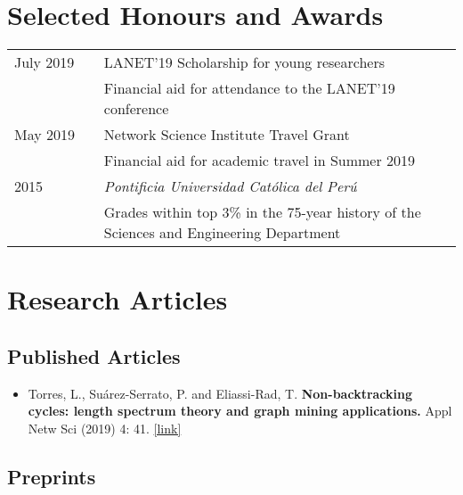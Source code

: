 \documentclass[12pt,]{scrartcl}
\begin{document}
\section{Selected Honours and
Awards}\label{selected-honours-and-awards}

\begin{table}[!h]
{\def\arraystretch{1.5}\tabcolsep=0pt
\begin{tabular}{p{0.2\linewidth}p{0.8\linewidth}}

July 2019 & LANET'19 Scholarship for young researchers \\
& Financial aid for attendance to the LANET'19 conference \\

May 2019 & Network Science Institute Travel Grant \\
& Financial aid for academic travel in Summer 2019 \\

2015 & \textit{Pontificia Universidad Católica del Perú} \\
& Grades within top 3\% in the 75-year history of the Sciences and Engineering Department \\

\end{tabular}%
}
\end{table}


\newpage
\section{Research Articles}\label{publications}

\subsection{Published Articles}\label{articles}

\begin{itemize}
\leftskip-0.25in %

\item Torres, L., Su\'arez-Serrato, P. and Eliassi-Rad, T.  \textbf{Non-backtracking cycles: length spectrum theory and graph mining applications.}  Appl Netw Sci (2019) 4: 41. \href{https://doi.org/10.1007/s41109-019-0147-y}{[link]}

\end{itemize}


\subsection{Preprints}\label{preprints}
\end{document}
